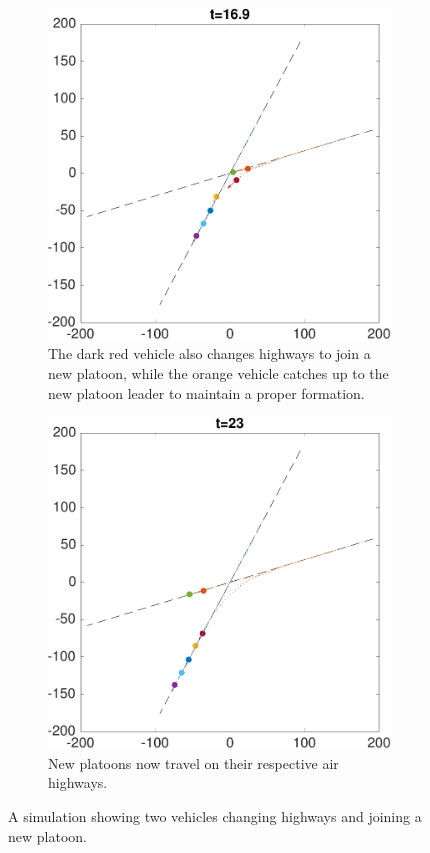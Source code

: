 \begin{figure}
    \begin{subfigure}[t]{0.45\textwidth} \label{subfig:ch_170}
        \includegraphics[width=\textwidth]{fig/ch_170}
        \caption{The dark red vehicle also changes highways to join a new platoon, while the orange vehicle catches up to the new platoon leader to maintain a proper formation.}
    \end{subfigure}
    \begin{subfigure}[t]{0.45\textwidth} \label{subfig:ch_231}
        \includegraphics[width=\textwidth]{fig/ch_231}
        \caption{New platoons now travel on their respective air highways.}
    \end{subfigure}   
    \caption{A simulation showing two vehicles changing highways and joining a new platoon. \label{fig:ch}}
\end{figure}
